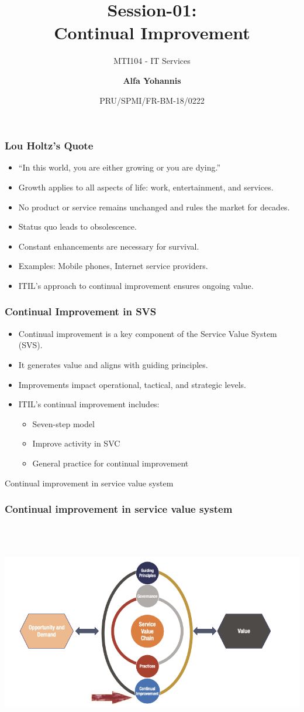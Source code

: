 \documentclass[aspectratio=169, table]{beamer}
\subtitle{MTI104 - IT Services}
\title{Session-01:\\\LARGE{Continual Improvement\\}}
\date[Serial]{\scriptsize {PRU/SPMI/FR-BM-18/0222}}
\author[Pradita]{\small{\textbf{Alfa Yohannis}}}
\begin{document}
\frame{\titlepage}

	
	\begin{frame}
		\frametitle{Lou Holtz's Quote}
		\begin{itemize}
			\item “In this world, you are either growing or you are dying.”
			\item Growth applies to all aspects of life: work, entertainment, and services.
			\item No product or service remains unchanged and rules the market for decades.
			\item Status quo leads to obsolescence.
			\item Constant enhancements are necessary for survival.
			\item Examples: Mobile phones, Internet service providers.
			\item ITIL's approach to continual improvement ensures ongoing value.
		\end{itemize}
	\end{frame}
	
	\begin{frame}
		\frametitle{Continual Improvement in SVS}
		\begin{itemize}
			\item Continual improvement is a key component of the Service Value System (SVS).
			\item It generates value and aligns with guiding principles.
			\item Improvements impact operational, tactical, and strategic levels.
			\item ITIL's continual improvement includes:
			\begin{itemize}
				\item Seven-step model
				\item Improve activity in SVC
				\item General practice for continual improvement
			\end{itemize}
		\end{itemize}
	\end{frame}
	
	\begin{frame}{Continual improvement in service value system} 	 \frametitle{Continual improvement in service value system} \begin{center} 	\includegraphics[width=0.8\linewidth]{images/image-01.png} \end{center} \end{frame}
	
\end{document}
